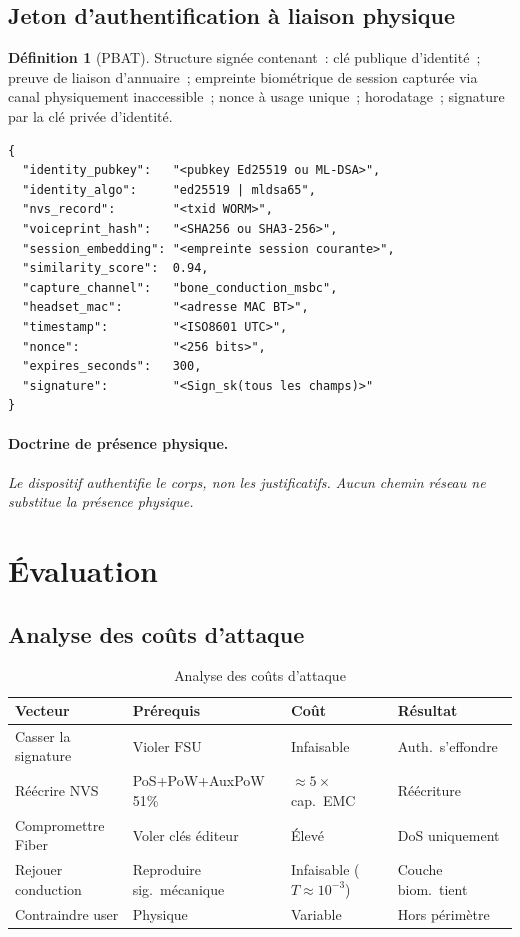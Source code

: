 \documentclass[11pt,a4paper]{article}
\theoremstyle{definition}
\newtheorem{definition}[theorem]{Définition}
\newcommand{\OWF}{\mathrm{FSU}}
\newcommand{\PBAT}{\textsf{PBAT}}
\begin{document}
\subsection{Jeton d'authentification à liaison physique}

\begin{definition}[\PBAT{}]
\label{def:pbat}
Structure signée contenant~: clé publique d'identité~; preuve de
liaison d'annuaire~; empreinte biométrique de session capturée via
canal physiquement inaccessible~; nonce à usage unique~; horodatage~;
signature par la clé privée d'identité.
\end{definition}

\begin{lstlisting}
{
  "identity_pubkey":   "<pubkey Ed25519 ou ML-DSA>",
  "identity_algo":     "ed25519 | mldsa65",
  "nvs_record":        "<txid WORM>",
  "voiceprint_hash":   "<SHA256 ou SHA3-256>",
  "session_embedding": "<empreinte session courante>",
  "similarity_score":  0.94,
  "capture_channel":   "bone_conduction_msbc",
  "headset_mac":       "<adresse MAC BT>",
  "timestamp":         "<ISO8601 UTC>",
  "nonce":             "<256 bits>",
  "expires_seconds":   300,
  "signature":         "<Sign_sk(tous les champs)>"
}
\end{lstlisting}

\paragraph{Doctrine de présence physique.}
\emph{Le dispositif authentifie le corps, non les justificatifs.
Aucun chemin réseau ne substitue la présence physique.}

\section{Évaluation}
\label{sec:evaluation}

\subsection{Analyse des coûts d'attaque}
\label{sec:eval_attack}

\begin{table}[h]
\centering
\caption{Analyse des coûts d'attaque}
\label{tab:attacks}
\renewcommand{\arraystretch}{1.2}
\begin{tabular}{p{2.8cm}p{3.5cm}p{3cm}p{3cm}}
\toprule
Vecteur & Prérequis & Coût & Résultat \\
\midrule
Casser la signature & Violer $\OWF$ & Infaisable & Auth.\ s'effondre \\
Réécrire NVS & PoS+PoW+AuxPoW 51\% & $\approx\!5\times$ cap.\ EMC~\cite{Kho21} & Réécriture \\
Compromettre Fiber & Voler clés éditeur & Élevé & DoS uniquement \\
Rejouer conduction & Reproduire sig.\ mécanique & Infaisable ($T\approx 10^{-3}$) & Couche biom.\ tient \\
Contraindre user & Physique & Variable & Hors périmètre \\
\bottomrule
\end{tabular}
\end{table}
\end{document}
